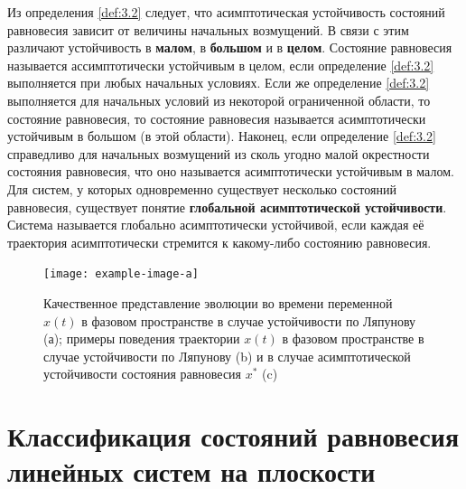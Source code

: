 Из определения \ref{def:3.2} следует, что асимптотическая устойчивость состояний равновесия зависит от величины начальных возмущений. В связи с этим различают устойчивость в \textbf{малом}, в \textbf{большом} и в \textbf{целом}. Состояние равновесия называется ассимптотически устойчивым в целом, если определение \ref{def:3.2} выполняется при любых начальных условиях. Если же определение \ref{def:3.2} выполняется для начальных условий из некоторой ограниченной области, то состояние равновесия, то состояние равновесия называется асимптотически устойчивым в большом (в этой области). Наконец, если определение \ref{def:3.2} справедливо для начальных  возмущений из сколь угодно малой окрестности состояния равновесия, что оно называется асимптотически устойчивым в малом.
Для систем, у которых одновременно существует несколько состояний равновесия, существует понятие \textbf{ глобальной асимптотической устойчивости}. Система называется глобально асимптотически устойчивой, если каждая её траектория асимптотически  стремится к какому-либо состоянию равновесия.

\begin{figure}[h!]
        \centering
        \texttt{[image: example-image-a]}
        \label{fig:3.2}
        \caption{Качественное представление эволюции во времени переменной $x(t)$ в фазовом пространстве в случае устойчивости по Ляпунову (а); примеры поведения траектории $x(t)$ в фазовом пространстве в случае устойчивости по Ляпунову (b) и в случае асимптотической устойчивости состояния равновесия $x^*$ (c) }
\end{figure}

\section{Классификация состояний равновесия линейных систем на плоскости}%
\label{sub:3.2}

